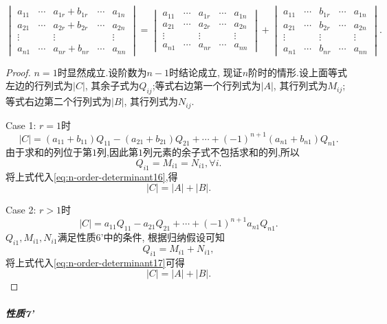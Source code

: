\[
  \begin{vmatrix}
    a_{11}&\cdots&a_{1r}+b_{1r}&\cdots&a_{1n}\\
    a_{21}&\cdots&a_{2r}+b_{2r}&\cdots&a_{2n}\\
    \vdots&&\vdots&&\vdots\\
    a_{n1}&\cdots&a_{nr}+b_{nr}&\cdots&a_{nn}
  \end{vmatrix} =
  \begin{vmatrix}
    a_{11}&\cdots&a_{1r}&\cdots&a_{1n}\\
    a_{21}&\cdots&a_{2r}&\cdots&a_{2n}\\
    \vdots&&\vdots&&\vdots\\
    a_{n1}&\cdots&a_{nr}&\cdots&a_{nn}    
  \end{vmatrix} +
  \begin{vmatrix}
    a_{11}&\cdots&b_{1r}&\cdots&a_{1n}\\
    a_{21}&\cdots&b_{2r}&\cdots&a_{2n}\\
    \vdots&&\vdots&&\vdots\\
    a_{n1}&\cdots&b_{nr}&\cdots&a_{nn}    
  \end{vmatrix}.
\]

\begin{proof}
  $n=1$时显然成立.设阶数为$n-1$时结论成立,
  现证$n$阶时的情形.设上面等式左边的行列式为$|C|$,
  其余子式为$Q_{ij}$;等式右边第一个行列式为$|A|$,
  其行列式为$M_{ij}$;等式右边第二个行列式为$|B|$,
  其行列式为$N_{ij}$.

  Case 1: $r=1$时
  \begin{equation}\label{eq:n-order-determinant16}
    |C|=(a_{11}+b_{11})Q_{11}-(a_{21}+b_{21})Q_{21}+\cdots+
    (-1)^{n+1}(a_{n1}+b_{n1})Q_{n1}.
  \end{equation}
  由于求和的列位于第$1$列,因此第$1$列元素的余子式不包括求和的列,所以
  \[
    Q_{i1}=M_{i1}=N_{i1}, \forall i.
  \]
  将上式代入\eqref{eq:n-order-determinant16},得
  \[
    |C|=|A|+|B|.
  \]

  Case 2: $r>1$时
  \begin{equation}\label{eq:n-order-determinant17}
    |C|=a_{11}Q_{11}-a_{21}Q_{21}+\cdots+(-1)^{n+1}a_{n1}Q_{n1}.
  \end{equation}
  $Q_{i1},M_{i1},N_{i1}$满足性质6'中的条件,
  根据归纳假设可知
  \[
    Q_{i1}=M_{i1}+N_{i1},
  \]
  将上式代入\eqref{eq:n-order-determinant17}可得
  \[
    |C|=|A|+|B|.
  \]
\end{proof}

\subparagraph{\color{ecolor}性质7'}

